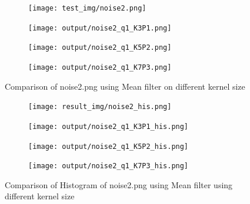 \documentclass[12pt,a4paper]{report}
\begin{document}
\begin{figure}[!htb]
  \begin{minipage}{\linewidth}
    \centering
    \begin{subfigure}{0.49\textwidth}
      \texttt{[image: test\_img/noise2.png]}
    \end{subfigure}
    \begin{subfigure}{0.49\textwidth}
      \texttt{[image: output/noise2\_q1\_K3P1.png]}
    \end{subfigure}

    \begin{subfigure}{0.49\textwidth}
      \texttt{[image: output/noise2\_q1\_K5P2.png]}
    \end{subfigure}
    \begin{subfigure}{0.49\textwidth}
      \texttt{[image: output/noise2\_q1\_K7P3.png]}
    \end{subfigure}

  \caption{Comparison of noise2.png using Mean filter on different kernel size}
  \end{minipage}

\end{figure}
\begin{figure}[!htb]
  \begin{minipage}{\linewidth}
    \centering
    \begin{subfigure}{1\textwidth}
      \texttt{[image: result\_img/noise2\_his.png]}
    \end{subfigure}
    \begin{subfigure}{1\textwidth}
      \texttt{[image: output/noise2\_q1\_K3P1\_his.png]}
    \end{subfigure}

    \begin{subfigure}{1\textwidth}
      \texttt{[image: output/noise2\_q1\_K5P2\_his.png]}
    \end{subfigure}
    \begin{subfigure}{1\textwidth}
      \texttt{[image: output/noise2\_q1\_K7P3\_his.png]}
    \end{subfigure}
    
  \caption{Comparison of Histogram of noise2.png using Mean filter using different kernel size}
\label{fig:n2-mean-hist}
\end{minipage}
\end{figure}
\clearpage
\end{document}
